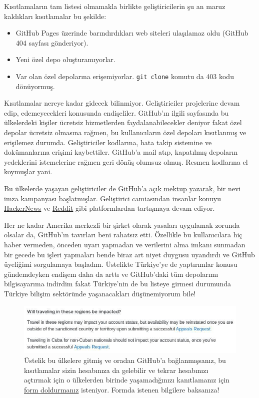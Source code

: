 \documentclass[11pt]{article}
\begin{document}
Kısıtlamaların tam listesi olmamakla birlikte geliştiricilerin şu an maruz
kaldıkları kısıtlamalar bu şekilde:

\begin{itemize}
\item GitHub Pages üzerinde barındırdıkları web siteleri ulaşılamaz oldu (GitHub
404 sayfası gönderiyor).
\item Yeni özel depo oluşturamıyorlar.
\item Var olan özel depolarına erişemiyorlar. \texttt{git clone} komutu da 403 kodu
dönüyormuş.
\end{itemize}

Kısıtlamalar nereye kadar gidecek bilinmiyor. Geliştiriciler projelerine devam
edip, edemeyecekleri konusunda endişeliler. GitHub'ın ilgili sayfasında bu
ülkelerdeki kişiler ücretsiz hizmetlerden faydalanabilecekler deniyor fakat
özel depolar ücretsiz olmasına rağmen, bu kullanıcıların özel depoları
kısıtlanmış ve erişilemez durumda. Geliştiriciler kodlarına, hata takip
sistemine ve dokümanlarına erişimi kaybettiler. GitHub'a mail atıp, kapatılmış
depoların yedeklerini istemelerine rağmen geri dönüş olumsuz olmuş. Resmen
kodlarına el koymuşlar yani.

Bu ülkelerde yaşayan geliştiriciler de \href{https://github.com/1995parham/github-do-not-ban-us}{GitHub'a açık mektup yazarak}, bir nevi
imza kampanyası başlatmışlar. Geliştirici camiasından insanlar konuyu
\href{https://news.ycombinator.com/item?id=20531039}{HackerNews} ve \href{https://www.reddit.com/r/programming/comments/chwq3b/my\_github\_account\_has\_been\_restricted\_due\_to\_us/}{Reddit} gibi platformlardan tartışmaya devam ediyor.

Her ne kadar Amerika merkezli bir şirket olarak yasaları uygulamak zorunda
olsalar da, GitHub'ın tavırları beni rahatsız etti. Özellikle bu kullanıcılara
hiç haber vermeden, önceden uyarı yapmadan ve verilerini alma imkanı sunmadan
bir gecede bu işleri yapmaları bende biraz art niyet duygusu uyandırdı ve
GitHub üyeliğimi sorgulamaya başladım. Üstelikte Türkiye'ye de yaptırımlar
konusu gündemdeyken endişem daha da arttı ve GitHub'daki tüm depolarımı
bilgisayarıma indirdim fakat Türkiye'nin de bu listeye girmesi durumunda
Türkiye bilişim sektöründe yaşanacakları düşünemiyorum bile!

\begin{figure}[htbp]
\centering
\includegraphics[width=.9\linewidth]{gorseller/github-amerika-yaptirimlari-2.jpg}
\caption{Üstelik bu ülkelere gitmiş ve oradan GitHub'a bağlanmışsanız, bu kısıtlamalar sizin hesabınıza da gelebilir ve tekrar hesabınızı açtırmak için o ülkelerden birinde yaşamadığınızı kanıtlamanız için \href{https://airtable.com/shrGBcceazKIoz6pY}{form doldurmanız} isteniyor. Formda istenen bilgilere baksanıza!}
\end{figure}
\end{document}
